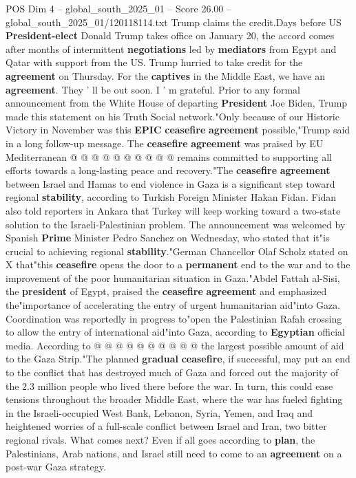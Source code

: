\begin{textsample}{POS Dim 4 – global\_south\_2025\_01 – Score 26.00 – global\_south\_2025\_01/120118114.txt}
Trump claims the credit.Days before US \textbf{President-elect} Donald Trump takes office on January 20, the accord comes after months of intermittent \textbf{negotiations} led by \textbf{mediators} from Egypt and Qatar with support from the US.
Trump hurried to take credit for the \textbf{agreement} on Thursday.
For the \textbf{captives} in the Middle East, we have an \textbf{agreement}.
They ' ll be out soon.
I ' m grateful.
Prior to any formal announcement from the White House of departing \textbf{President} Joe Biden, Trump made this statement on his Truth Social network."Only because of our Historic Victory in November was this \textbf{EPIC} \textbf{ceasefire} \textbf{agreement} possible,"Trump said in a long follow-up message.
The \textbf{ceasefire} \textbf{agreement} was praised by EU Mediterranean @ @ @ @ @ @ @ @ @ @ remains committed to supporting all efforts towards a long-lasting peace and recovery."The \textbf{ceasefire} \textbf{agreement} between Israel and Hamas to end violence in Gaza is a significant step toward regional \textbf{stability}, according to Turkish Foreign Minister Hakan Fidan.
Fidan also told reporters in Ankara that Turkey will keep working toward a two-state solution to the Israeli-Palestinian problem.
The announcement was welcomed by Spanish \textbf{Prime} Minister Pedro Sanchez on Wednesday, who stated that it"is crucial to achieving regional \textbf{stability}."German Chancellor Olaf Scholz stated on X that"this \textbf{ceasefire} opens the door to a \textbf{permanent} end to the war and to the improvement of the poor humanitarian situation in Gaza."Abdel Fattah al-Sisi, the \textbf{president} of Egypt, praised the \textbf{ceasefire} \textbf{agreement} and emphasized the"importance of accelerating the entry of urgent humanitarian aid"into Gaza.
Coordination was reportedly in progress to"open the Palestinian Rafah crossing to allow the entry of international aid"into Gaza, according to \textbf{Egyptian} official media.
According to @ @ @ @ @ @ @ @ @ @ the largest possible amount of aid to the Gaza Strip."The planned \textbf{gradual} \textbf{ceasefire}, if successful, may put an end to the conflict that has destroyed much of Gaza and forced out the majority of the 2.3 million people who lived there before the war.
In turn, this could ease tensions throughout the broader Middle East, where the war has fueled fighting in the Israeli-occupied West Bank, Lebanon, Syria, Yemen, and Iraq and heightened worries of a full-scale conflict between Israel and Iran, two bitter regional rivals.
What comes next?
Even if all goes according to \textbf{plan}, the Palestinians, Arab nations, and Israel still need to come to an \textbf{agreement} on a post-war Gaza strategy.

\end{textsample}
